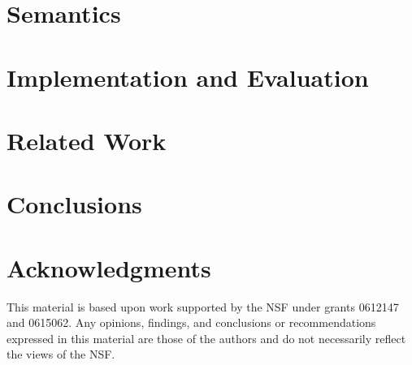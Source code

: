 \documentclass[natbib]{sigplanconf}
\begin{document}
\section{\padsd{} Semantics}
\label{sec:semantics}


\section{\padsd{} Implementation and Evaluation}
\label{sec:implementation}


\section{Related Work}
\label{sec:related}


\section{Conclusions}
\label{sec:conclusions}


 \section*{Acknowledgments}
 This material is based upon work 
 supported by the NSF
    under grants 0612147 and 0615062.
 Any opinions, findings, and conclusions or recommendations
    expressed in this material are those of the authors and do not
    necessarily reflect the views of the NSF.





%
\end{document}
